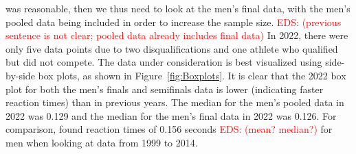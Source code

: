 \documentclass[12pt, letterpaper, titlepage]{article}
\newcommand{\eds}[1]{\textcolor{red}{EDS: (#1)}}
\begin{document}
was reasonable, then we thus need to look at the men's final data, with the men's
pooled data being included in order to increase the sample size.  
\eds{previous sentence is not clear; pooled data already includes final data}
In 2022, there
were only five data points due to two disqualifications and one athlete who 
qualified but did not compete.
The data under consideration is best visualized using side-by-side box plots, as
shown in Figure~\ref{fig:Boxplots}.  It is clear that the 2022 box plot for both 
the men's finals and semifinals data is lower (indicating faster reaction times)
than in previous years.  The median for the men's pooled data in 2022 was 0.129
and the median for the men's final data in 2022 was 0.126.  For comparison,
\citet{brosnan2017effects} found reaction times of 0.156 seconds \eds{mean?  median?} for men when looking at data from 1999 to 2014.
\end{document}
